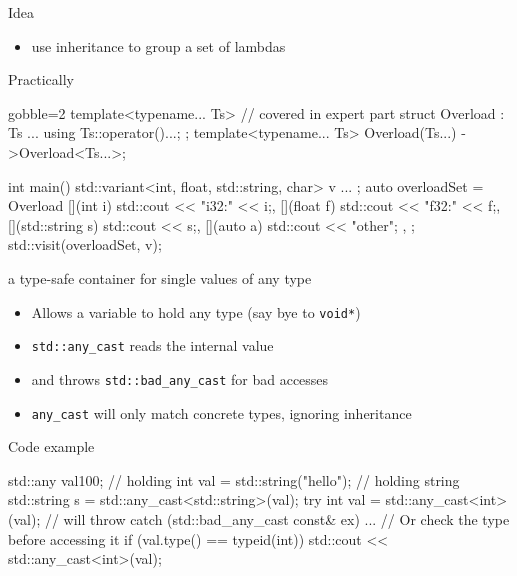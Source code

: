 \begin{frame}[fragile]
  \begin{exampleblock}{Idea}
    \begin{itemize}
    \item use inheritance to group a set of lambdas
    \end{itemize}
  \end{exampleblock}
  \begin{block}{Practically}
    \small
    \begin{cppcode*}{gobble=2}
      template<typename... Ts> // covered in expert part
      struct Overload : Ts ... { using Ts::operator()...; };
      template<typename... Ts> Overload(Ts...) ->Overload<Ts...>;

      int main(){
        std::variant<int, float, std::string, char> v{ ... };
        auto overloadSet = Overload {
          [](int i) { std::cout << "i32:" << i;},
          [](float f) { std::cout << "f32:" << f;},
          [](std::string s) { std::cout << s;},
          [](auto a) { std::cout << "other"; },
        };
        std::visit(overloadSet, v);
      }
    \end{cppcode*}
  \end{block}
\end{frame}

\begin{frame}[fragile]
  \begin{block}{a type-safe container for single values of any type}
    \begin{itemize}
    \item Allows a variable to hold any type (say bye to \texttt{void*})
    \item \texttt{std::any_cast} reads the internal value
    \item and throws \texttt{std::bad_any_cast} for bad accesses
    \item \texttt{any_cast} will only match concrete types, ignoring inheritance
    \end{itemize}
  \end{block}
  \begin{exampleblock}{Code example}
    \small
    \begin{cppcode*}{}
      std::any val{100};          // holding int
      val = std::string("hello"); // holding string
      std::string s = std::any_cast<std::string>(val);
      try {
        int val = std::any_cast<int>(val); // will throw
      } catch (std::bad_any_cast const& ex) {...}
      // Or check the type before accessing it
      if (val.type() == typeid(int))
        std::cout << std::any_cast<int>(val);
    \end{cppcode*}
  \end{exampleblock}
\end{frame}

